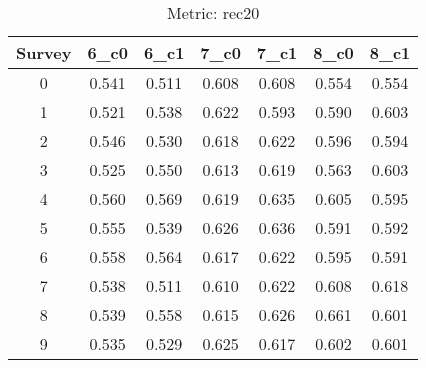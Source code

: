 \documentclass{article}
\begin{document}
\begin{table}[tbh]
\begin{center}
\begin{tabular}{|*{7}{c|}}
\hline
 Survey & 6\_c0 & 6\_c1 & 7\_c0 & 7\_c1 & 8\_c0 & 8\_c1 \\ 
\hline
0 & 0.541 & 0.511 & 0.608 & 0.608 & 0.554 & 0.554 \\ 
1 & 0.521 & 0.538 & 0.622 & 0.593 & 0.590 & 0.603 \\ 
2 & 0.546 & 0.530 & 0.618 & 0.622 & 0.596 & 0.594 \\ 
3 & 0.525 & 0.550 & 0.613 & 0.619 & 0.563 & 0.603 \\ 
4 & 0.560 & 0.569 & 0.619 & 0.635 & 0.605 & 0.595 \\ 
5 & 0.555 & 0.539 & 0.626 & 0.636 & 0.591 & 0.592 \\ 
6 & 0.558 & 0.564 & 0.617 & 0.622 & 0.595 & 0.591 \\ 
7 & 0.538 & 0.511 & 0.610 & 0.622 & 0.608 & 0.618 \\ 
8 & 0.539 & 0.558 & 0.615 & 0.626 & 0.661 & 0.601 \\ 
9 & 0.535 & 0.529 & 0.625 & 0.617 & 0.602 & 0.601 \\ 
\hline
\end{tabular}
\end{center}
\caption{Metric: rec20}
\end{table}
\end{document}
